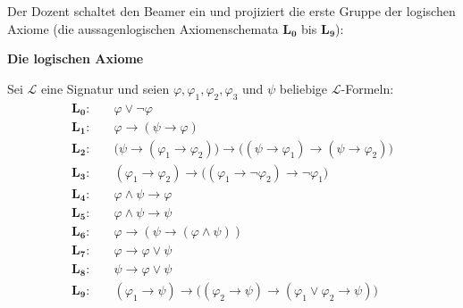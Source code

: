 \begin{meta-note}
Der Dozent schaltet den Beamer ein und projiziert die erste Gruppe der logischen Axiome (die aussagenlogischen Axiomenschemata $\mathbf{L_0}$ bis $\mathbf{L_9}$):
\begin{center}
\textbf{Die logischen Axiome}
\end{center}
Sei $\mathcal{L}$ eine Signatur und seien $\varphi, \varphi_1, \varphi_2, \varphi_3$ und $\psi$ beliebige $\mathcal{L}$-Formeln:
\begin{align*}
\mathbf{L_0}\colon &\quad \varphi \vee \neg\varphi \\
\mathbf{L_1}\colon &\quad \varphi \rightarrow (\psi \rightarrow \varphi) \\
\mathbf{L_2}\colon &\quad \bigl(\psi \rightarrow (\varphi_1 \rightarrow \varphi_2)\bigr) \rightarrow \bigl((\psi \rightarrow \varphi_1) \rightarrow (\psi \rightarrow \varphi_2)\bigr) \\
\mathbf{L_3}\colon &\quad (\varphi_1 \rightarrow \varphi_2) \rightarrow \bigl((\varphi_1 \rightarrow \neg\varphi_2) \rightarrow \neg\varphi_1\bigr) \\
\mathbf{L_4}\colon &\quad \varphi \wedge \psi \rightarrow \varphi \\
\mathbf{L_5}\colon &\quad \varphi \wedge \psi \rightarrow \psi \\
\mathbf{L_6}\colon &\quad \varphi \rightarrow (\psi \rightarrow (\varphi \wedge \psi)) \\
\mathbf{L_7}\colon &\quad \varphi \rightarrow \varphi \vee \psi \\
\mathbf{L_8}\colon &\quad \psi \rightarrow \varphi \vee \psi \\
\mathbf{L_9}\colon &\quad (\varphi_1 \rightarrow \psi) \rightarrow \bigl((\varphi_2 \rightarrow \psi) \rightarrow (\varphi_1 \vee \varphi_2 \rightarrow \psi)\bigr)
\end{align*}
\end{meta-note}

\begin{ai-global-state-checkpoint-invisible-content}
\end{ai-global-state-checkpoint-invisible-content}


